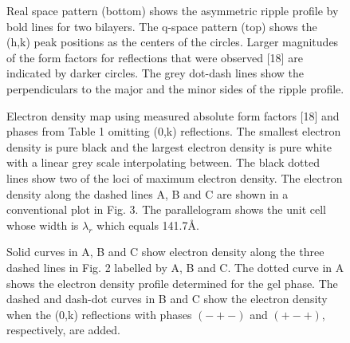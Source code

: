 \begin{figure}
\caption{Real space pattern (bottom) shows the asymmetric ripple profile by 
bold lines for two bilayers.  The q-space pattern (top) shows the (h,k) 
peak positions as the centers of the circles.  Larger magnitudes of the 
form factors for reflections that were observed [18] are indicated 
by darker circles.  The grey dot-dash lines show the perpendiculars to the 
major and the minor sides of the ripple profile.
\label{Fig1}}
\end{figure}

\begin{figure}
\caption{Electron density map using measured absolute form factors 
[18] and phases from Table 1 omitting (0,k) reflections.  The smallest 
electron density is pure black and the largest electron density is pure 
white with a linear grey scale interpolating between.  The black dotted 
lines show two of the loci of maximum electron density. The electron 
density along the dashed lines A, B and C are shown in a conventional plot 
in Fig. 3.  The parallelogram shows the unit cell whose width is $\lambda_r$ 
which equals 141.7\AA.
\label{Fig2}}
\end{figure}

\begin{figure}
\caption{Solid curves in A, B and C show electron density along the three 
dashed lines in Fig. 2 labelled by A, B and C.  The dotted curve in
A shows the electron density profile determined for the gel phase.
The dashed and dash-dot curves in B and C show the electron density when
the (0,k) reflections with phases $(-+-)$ and $(+-+)$, respectively, are
added.
\label{Fig3}}
\end{figure}


